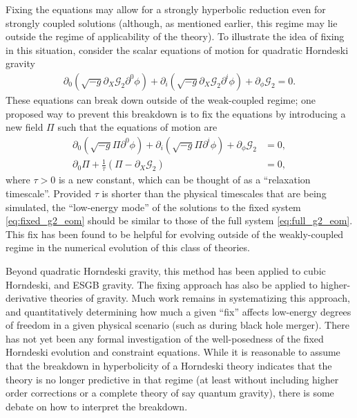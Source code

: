\documentclass{ws-ijmpd}
\begin{document}
Fixing the equations may allow for a strongly
hyperbolic reduction even for strongly coupled solutions
(although, as mentioned earlier, this
regime may lie outside the regime of applicability of
the theory).
To illustrate the idea of fixing in this situation, 
consider the scalar equations
of motion for quadratic Horndeski gravity
\begin{align}
   \label{eq:full_g2_eom}
   \partial_{0}\left(
      \sqrt{-g}\partial_X\mathcal{G}_2\partial^0\phi
   \right)
   +
   \partial_{i}\left(
      \sqrt{-g}\partial_X\mathcal{G}_2\partial^i\phi
   \right)
   +
   \partial_{\phi}\mathcal{G}_2
   =
   0
   .
\end{align}
These equations can break down outside of the weak-coupled
regime\cite{Babichev:2016hys,Babichev:2017lrx}; 
one proposed way to prevent this breakdown
is to fix the equations by introducing a new field $\Pi$
such that the equations of motion are\cite{Bezares:2021yek}
\begin{subequations}
\label{eq:fixed_g2_eom}
\begin{align}
   \partial_{0}\left(
      \sqrt{-g}\Pi \partial^0\phi
   \right)
   +
   \partial_{i}\left(
      \sqrt{-g}\Pi \partial^i\phi
   \right)
   +
   \partial_{\phi}\mathcal{G}_2
   &=
   0
   ,\\
   \partial_0\Pi
   +
   \frac{1}{\tau}\left(\Pi - \partial_X\mathcal{G}_2\right)
   &=
   0
   ,
\end{align}
\end{subequations}
where $\tau>0$ is a new constant, which can be thought of
as a ``relaxation timescale''.
Provided $\tau$ is shorter than the physical timescales that
are being simulated, the ``low-energy mode'' of the solutions 
to the fixed system \eqref{eq:fixed_g2_eom} should
be similar to those of the full system \eqref{eq:full_g2_eom}.
This fix has been found to be helpful for evolving outside
of the weakly-coupled regime in the 
numerical evolution of this class of 
theories\cite{Bezares:2021yek,Bezares:2021dma,Lara:2021piy}.

Beyond quadratic Horndeski gravity, this method has been applied to
cubic Horndeski\cite{Gerhardinger:2022bcw}, and
ESGB gravity\cite{Franchini:2022ukz}.
The fixing approach has also be applied
to higher-derivative theories of gravity\cite{Allwright:2018rut,Cayuso:2020lca}.
Much work remains in systematizing this approach, and quantitatively
determining how much a given ``fix'' affects low-energy degrees
of freedom in a given physical scenario (such as during black hole merger).
There has not yet been any formal investigation of the
well-posedness of the fixed Horndeski evolution and constraint equations.
While it is reasonable to assume that the breakdown in hyperbolicity
of a Horndeski theory indicates that the theory is no longer predictive
in that regime 
(at least without including higher order corrections or a complete theory of say
quantum gravity), there is some debate on how to interpret 
the breakdown\cite{Corelli:2022pio,Corelli:2022phw}.
\end{document}
